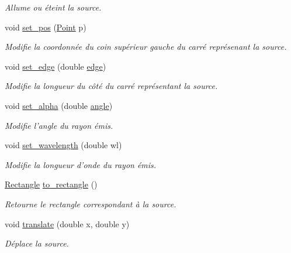 \begin{DoxyCompactItemize}
\begin{DoxyCompactList}\small\item\em Allume ou éteint la source. \end{DoxyCompactList}\item 
void \hyperlink{classSource_a23ddbdb1c598e1b5b436b587ef034602}{set\+\_\+pos} (\hyperlink{classPoint}{Point} p)
\begin{DoxyCompactList}\small\item\em Modifie la coordonnée du coin supérieur gauche du carré représenant la source. \end{DoxyCompactList}\item 
void \hyperlink{classSource_a735c759b95b222a9a8e78a190125c70b}{set\+\_\+edge} (double \hyperlink{classSource_a1b9bee6ad0a5d80e99ec9dd4d6ef1cae}{edge})
\begin{DoxyCompactList}\small\item\em Modifie la longueur du côté du carré représentant la source. \end{DoxyCompactList}\item 
void \hyperlink{classSource_a67095cf21061988628339761d1496c18}{set\+\_\+alpha} (double \hyperlink{classSource_ab31305003e1300e56d0175e72daac9fa}{angle})
\begin{DoxyCompactList}\small\item\em Modifie l’angle du rayon émis. \end{DoxyCompactList}\item 
void \hyperlink{classSource_ac532d06d465419347681aa30c9af8b78}{set\+\_\+wavelength} (double wl)
\begin{DoxyCompactList}\small\item\em Modifie la longueur d’onde du rayon émis. \end{DoxyCompactList}\item 
\hyperlink{classRectangle}{Rectangle} \hyperlink{classSource_a7bf9d713bd710606dcba3f249d20f489}{to\+\_\+rectangle} ()
\begin{DoxyCompactList}\small\item\em Retourne le rectangle correspondant à la source. \end{DoxyCompactList}\item 
void \hyperlink{classSource_a7f2bdc504f734a24cf67337a15a9e412}{translate} (double x, double y)
\begin{DoxyCompactList}\small\item\em Déplace la source. \end{DoxyCompactList}\end{DoxyCompactItemize}
